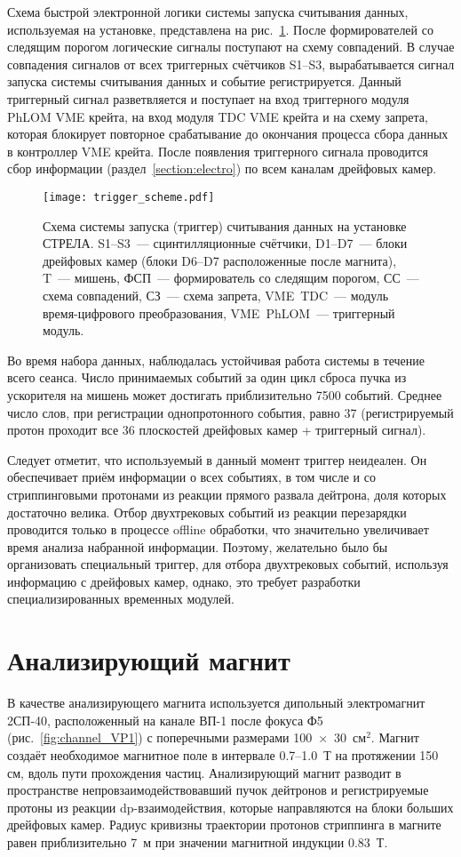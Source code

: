 Схема быстрой электронной логики системы запуска считывания данных, используемая
на установке, представлена на рис.~\ref{fig:trigger_scheme}. После
формирователей со следящим порогом логические сигналы поступают на схему
совпадений. В случае совпадения сигналов от всех триггерных счётчиков S1--S3,
вырабатывается сигнал запуска системы считывания данных и событие
регистрируется. Данный триггерный сигнал разветвляется и поступает на вход
триггерного модуля PhLOM VME крейта, на вход модуля TDC VME крейта и на схему
запрета, которая блокирует повторное срабатывание до окончания процесса сбора
данных в контроллер VME крейта. После появления триггерного сигнала проводится
сбор информации (раздел~\ref{section:electro}) по всем каналам дрейфовых камер.

\begin{figure}[h]
  \centering
  \texttt{[image: trigger\_scheme.pdf]}
  \caption{Схема системы запуска (триггер) считывания данных на установке
    СТРЕЛА. S1--S3~--- сцинтилляционные счётчики, D1--D7~--- блоки дрейфовых
    камер (блоки D6--D7 расположенные после магнита), T~--- мишень, ФСП~---
    формирователь со следящим порогом, СС~--- схема совпадений, СЗ~--- схема
    запрета, VME~TDC~--- модуль время-цифрового преобразования, VME~PhLOM~---
    триггерный модуль.}
  \label{fig:trigger_scheme}
\end{figure}

Во время набора данных, наблюдалась устойчивая работа системы в течение всего
сеанса. Число принимаемых событий за один цикл сброса пучка из ускорителя на
мишень может достигать приблизительно 7500 событий. Среднее число слов, при
регистрации однопротонного события, равно 37 (регистрируемый протон проходит
все 36 плоскостей дрейфовых камер + триггерный сигнал).

Следует отметит, что используемый в данный момент триггер неидеален. Он
обеспечивает приём информации о всех событиях, в том числе и со стриппинговыми
протонами из реакции прямого развала дейтрона, доля которых достаточно велика.
Отбор двухтрековых событий из реакции перезарядки проводится только в процессе
offline обработки, что значительно увеличивает время анализа набранной
информации. Поэтому, желательно было бы организовать специальный триггер, для
отбора двухтрековых событий, используя информацию с дрейфовых камер, однако, это
требует разработки специализированных временных модулей.

\section{Анализирующий магнит}
В качестве анализирующего магнита используется дипольный электромагнит 2СП-40,
расположенный на канале ВП-1 после фокуса Ф5 (рис.~\ref{fig:channel_VP1}) с
поперечными размерами 100~$\times$~30~см$^2$. Магнит создаёт необходимое
магнитное поле в интервале 0.7--1.0~Т на протяжении 150 см, вдоль пути
прохождения частиц. Анализирующий магнит разводит в пространстве
непровзаимодействовавший пучок дейтронов и регистрируемые протоны из реакции
dp-взаимодействия, которые направляются на блоки больших дрейфовых камер.
Радиус кривизны траектории протонов стриппинга в магните равен приблизительно
7~м при значении магнитной индукции 0.83~Т.

